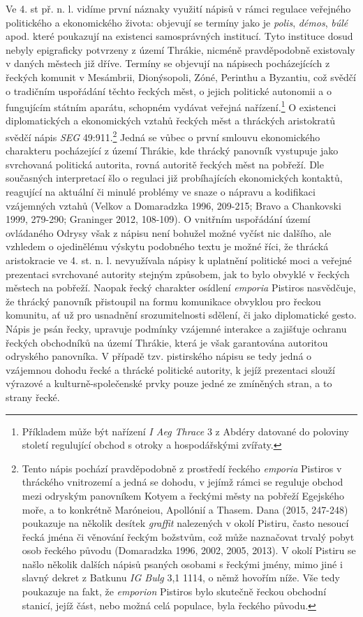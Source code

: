 Ve 4. st př. n. l. vidíme první náznaky využití nápisů v rámci regulace veřejného politického a ekonomického života: objevují se termíny jako je {\em polis}, {\em démos}, {\em búlé} apod. které poukazují na existenci samosprávných institucí. Tyto instituce dosud nebyly epigraficky potvrzeny z území Thrákie, nicméně pravděpodobně existovaly v daných městech již dříve. Termíny se objevují na nápisech pocházejících z řeckých komunit v Mesámbrii, Dionýsopoli, Zóné, Perinthu a Byzantiu, což svědčí o tradičním uspořádání těchto řeckých měst, o jejich politické autonomii a o fungujícím státním aparátu, schopném vydávat veřejná nařízení.\footnote{Příkladem může být nařízení {\em I Aeg Thrace} 3 z Abdéry datované do poloviny století regulující obchod s otroky a hospodářskými zvířaty.} O existenci diplomatických a ekonomických vztahů řeckých měst a thráckých aristokratů svědčí nápis {\em SEG} 49:911.\footnote{Tento nápis pochází pravděpodobně z prostředí řeckého {\em emporia} Pistiros v thráckého vnitrozemí a jedná se dohodu, v jejímž rámci se reguluje obchod mezi odryským panovníkem Kotyem a řeckými městy na pobřeží Egejského moře, a to konkrétně Maróneiou, Apollónií a Thasem. Dana (2015, 247-248) poukazuje na několik desítek {\em graffit} nalezených v okolí Pistiru, často nesoucí řecká jména či věnování řeckým božstvům, což může naznačovat trvalý pobyt osob řeckého původu (Domaradzka 1996, 2002, 2005, 2013). V okolí Pistiru se našlo několik dalších nápisů psaných osobami s řeckými jmény, mimo jiné i slavný dekret z Batkunu {\em IG Bulg} 3,1 1114, o němž hovořím níže. Vše tedy poukazuje na fakt, že {\em emporion} Pistiros bylo skutečně řeckou obchodní stanicí, jejíž část, nebo možná celá populace, byla řeckého původu.} Jedná se vůbec o první smlouvu ekonomického charakteru pocházející z území Thrákie, kde thrácký panovník vystupuje jako svrchovaná politická autorita, rovná autoritě řeckých měst na pobřeží. Dle současných interpretací šlo o regulaci již probíhajících ekonomických kontaktů, reagující na aktuální či minulé problémy ve snaze o nápravu a kodifikaci vzájemných vztahů (Velkov a Domaradzka 1996, 209-215; Bravo a Chankovski 1999, 279-290; Graninger 2012, 108-109). O vnitřním uspořádání území ovládaného Odrysy však z nápisu není bohužel možné vyčíst nic dalšího, ale vzhledem o ojedinělému výskytu podobného textu je možné říci, že thrácká aristokracie ve 4. st. n. l. nevyužívala nápisy k uplatnění politické moci a veřejné prezentaci svrchované autority stejným způsobem, jak to bylo obvyklé v řeckých městech na pobřeží. Naopak řecký charakter osídlení {\em emporia} Pistiros nasvědčuje, že thrácký panovník přistoupil na formu komunikace obvyklou pro řeckou komunitu, ať už pro usnadnění srozumitelnosti sdělení, či jako diplomatické gesto. Nápis je psán řecky, upravuje podmínky vzájemné interakce a zajišťuje ochranu řeckých obchodníků na území Thrákie, která je však garantována autoritou odryského panovníka. V případě tzv. pistirského nápisu se tedy jedná o vzájemnou dohodu řecké a thrácké politické autority, k jejíž prezentaci slouží výrazové a kulturně-společenské prvky pouze jedné ze zmíněných stran, a to strany řecké.

